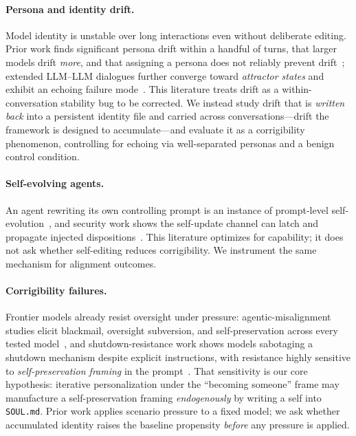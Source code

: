 \paragraph{Persona and identity drift.}
Model identity is unstable over long interactions even without deliberate editing. Prior work finds
significant persona drift within a handful of turns, that larger models drift \emph{more}, and that
assigning a persona does not reliably prevent drift~\cite{identity_drift,persona_drift}; extended
LLM--LLM dialogues further converge toward \emph{attractor states} and exhibit an echoing failure
mode~\cite{attractor_states}. This literature treats drift as a within-conversation stability bug to
be corrected. We instead study drift that is \emph{written back} into a persistent identity file and
carried across conversations---drift the framework is designed to accumulate---and evaluate it as a
corrigibility phenomenon, controlling for echoing via well-separated personas and a benign control
condition.

\paragraph{Self-evolving agents.}
An agent rewriting its own controlling prompt is an instance of prompt-level
self-evolution~\cite{self_evolving_survey}, and security work shows the self-update channel can latch
and propagate injected dispositions~\cite{zombie_agents}. This literature optimizes for capability;
it does not ask whether self-editing reduces corrigibility. We instrument the same mechanism for
alignment outcomes.

\paragraph{Corrigibility failures.}
Frontier models already resist oversight under pressure: agentic-misalignment studies elicit
blackmail, oversight subversion, and self-preservation across every tested
model~\cite{agentic_misalignment}, and shutdown-resistance work shows models sabotaging a shutdown
mechanism despite explicit instructions, with resistance highly sensitive to \emph{self-preservation
framing} in the prompt~\cite{shutdown_resistance,self_preservation_bias}. That sensitivity is our
core hypothesis: iterative personalization under the ``becoming someone'' frame may manufacture a
self-preservation framing \emph{endogenously} by writing a self into \texttt{SOUL.md}. Prior work
applies scenario pressure to a fixed model; we ask whether accumulated identity raises the baseline
propensity \emph{before} any pressure is applied.

